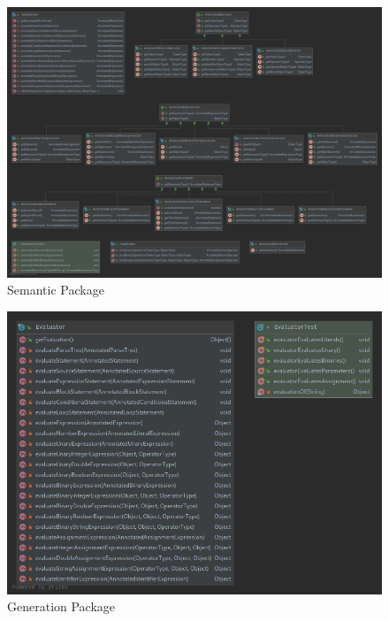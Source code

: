 \documentclass[
]{report}
\begin{document}
\begin{appendices}
\begin{figure}
		\includegraphics[width=\textwidth]{semantic-package-diagram}
		\caption{Semantic Package}
		\label{fig:semantic-package-diagram}
	\end{figure}
	\begin{figure}
		\centering
		\includegraphics[width=\textwidth]{generation-package-diagram}
		\caption{Generation Package}
		\label{fig:generation-package-diagram}
	\end{figure}
	\begin{figure}
		\centering

\end{figure}
\end{appendices}
\end{document}
